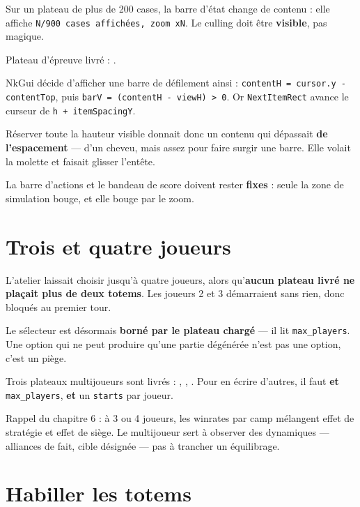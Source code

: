 Sur un plateau de plus de 200 cases, la barre d'état change de contenu : elle
affiche \texttt{N/900 cases affichées, zoom xN}. Le culling doit être
\textbf{visible}, pas magique.

Plateau d'épreuve livré : .

\begin{nkpiege}
NkGui décide d'afficher une barre de défilement ainsi :
\texttt{contentH = cursor.y - contentTop}, puis
\texttt{barV = (contentH - viewH) > 0}. Or \texttt{NextItemRect} avance le
curseur de \texttt{h + itemSpacingY}.

Réserver toute la hauteur visible donnait donc un contenu qui dépassait
\textbf{de l'espacement} — d'un cheveu, mais assez pour faire surgir une barre.
Elle volait la molette et faisait glisser l'entête.

La barre d'actions et le bandeau de score doivent rester \textbf{fixes} : seule
la zone de simulation bouge, et elle bouge par le zoom.
\end{nkpiege}

\section{Trois et quatre joueurs}

L'atelier laissait choisir jusqu'à quatre joueurs, alors qu'\textbf{aucun plateau
livré ne plaçait plus de deux totems}. Les joueurs 2 et 3 démarraient sans rien,
donc bloqués au premier tour.

Le sélecteur est désormais \textbf{borné par le plateau chargé} — il lit
\texttt{max\_players}. Une option qui ne peut produire qu'une partie dégénérée
n'est pas une option, c'est un piège.

Trois plateaux multijoueurs sont livrés : ,
, . Pour en écrire d'autres, il faut
\textbf{et} \texttt{max\_players}, \textbf{et} un \texttt{starts} par joueur.

\begin{nkpiege}
Rappel du chapitre 6 : à 3 ou 4 joueurs, les winrates par camp mélangent effet de
stratégie et effet de siège. Le multijoueur sert à observer des dynamiques —
alliances de fait, cible désignée — pas à trancher un équilibrage.
\end{nkpiege}

\section{Habiller les totems}

